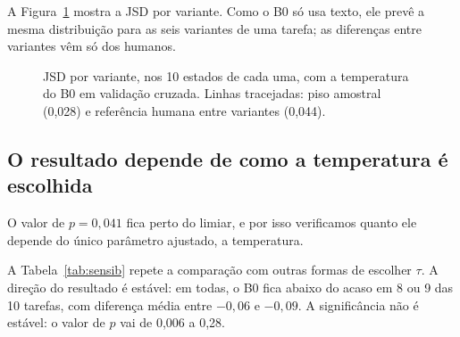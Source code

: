 \documentclass[12pt,oneside,a4paper,chapter=TITLE,english,brazil]{abntex2}
\begin{document}
A Figura~\ref{fig:variantes} mostra a JSD por variante. Como o B0 só usa texto, ele prevê a mesma distribuição para as seis variantes de uma tarefa; as diferenças entre variantes vêm só dos humanos.

\begin{figure}[htb]
\centering
\caption{JSD por variante, nos 10 estados de cada uma, com a temperatura do B0 em validação cruzada. Linhas tracejadas: piso amostral (0,028) e referência humana entre variantes (0,044).}
\label{fig:variantes}
\end{figure}

\subsection{O resultado depende de como a temperatura é escolhida}
\label{sec:sensibilidade}

O valor de $p=0{,}041$ fica perto do limiar, e por isso verificamos quanto ele depende do único parâmetro ajustado, a temperatura.

\begin{real}
A Tabela~\ref{tab:sensib} repete a comparação com outras formas de escolher $\tau$. A direção do resultado é estável: em todas, o B0 fica abaixo do acaso em 8 ou 9 das 10 tarefas, com diferença média entre $-0{,}06$ e $-0{,}09$. A significância não é estável: o valor de $p$ vai de 0,006 a 0,28.
\end{real}
\end{document}
